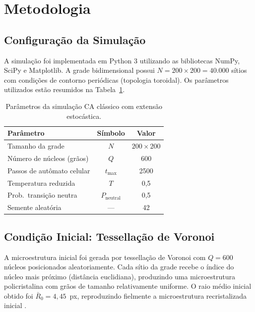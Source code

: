 \documentclass[12pt,a4paper]{article}
\begin{document}
\section{Metodologia}

\subsection{Configuração da Simulação}

A simulação foi implementada em Python 3 utilizando as bibliotecas NumPy, SciPy e
Matplotlib. A grade bidimensional possui $N = 200 \times 200 = 40{.}000$ sítios com
condições de contorno periódicas (topologia toroidal). Os parâmetros utilizados
estão resumidos na Tabela~\ref{tab:params}.

\begin{table}[H]
\centering
\caption{Parâmetros da simulação CA clássico com extensão estocástica.}
\label{tab:params}
\begin{tabular}{lcc}
\toprule
\textbf{Parâmetro} & \textbf{Símbolo} & \textbf{Valor} \\
\midrule
Tamanho da grade          & $N$               & $200 \times 200$ \\
Número de núcleos (grãos) & $Q$               & 600 \\
Passos de autômato celular& $t_{\max}$        & 2500 \\
Temperatura reduzida      & $T$               & 0{,}5 \\
Prob.\ transição neutra   & $P_{\text{neutral}}$ & 0{,}5 \\
Semente aleatória         & ---               & 42 \\
\bottomrule
\end{tabular}
\end{table}

\subsection{Condição Inicial: Tessellação de Voronoi}

A microestrutura inicial foi gerada por tessellação de Voronoi com $Q = 600$ núcleos
posicionados aleatoriamente. Cada sítio da grade recebe o índice do núcleo mais próximo
(distância euclidiana), produzindo uma microestrutura policristalina com grãos de
tamanho relativamente uniforme. O raio médio inicial obtido foi
$\bar{R}_0 = 4{,}45$~px, reproduzindo fielmente a microestrutura recristalizada
inicial \cite{humphreys2004}.
\end{document}
